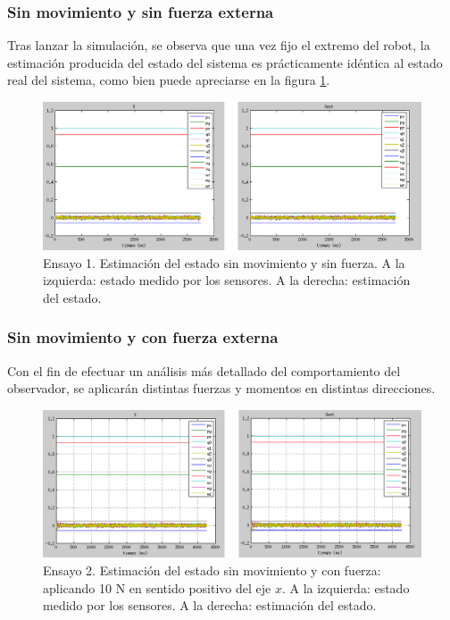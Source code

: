 
\subsubsection{Sin movimiento y sin fuerza externa}

Tras lanzar la simulación, se observa que una vez fijo el extremo del robot, la estimación producida del estado del sistema es prácticamente idéntica al estado real del sistema, como bien puede apreciarse en la figura \ref{fig:smsf-X}. \par 

\begin{figure}[h!]
\centering
\includegraphics[scale=0.4]{Figuras/smsf-X}
\caption[Ensayo 1. Estimación del estado sin movimiento y sin fuerza]{Ensayo 1. Estimación del estado sin movimiento y sin fuerza. A la izquierda: estado medido por los sensores. A la derecha: estimación del estado.}
\label{fig:smsf-X}
\end{figure}

\subsubsection{Sin movimiento y con fuerza externa}

Con el fin de efectuar un análisis más detallado del comportamiento del observador, se aplicarán distintas fuerzas y momentos en distintas direcciones. \par 

\begin{figure}[h!]
\centering
\includegraphics[scale=0.4]{Figuras/smcf-X}
\caption[Ensayo 2. Estimación del estado sin movimiento y con fuerza]{Ensayo 2. Estimación del estado sin movimiento y con fuerza: aplicando 10 N en sentido positivo del eje $x$. A la izquierda: estado medido por los sensores. A la derecha: estimación del estado.}
\label{fig:smcf-X}
\end{figure}

